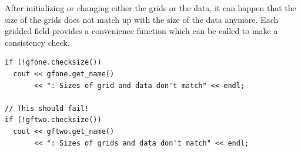 After initializing or changing either the grids or the data, it can happen that the size of the grids does not match up with the size of the data anymore. Each gridded field provides a convenience function which can be called to make a consistency check.

\begin{verbatim}
if (!gfone.checksize())
  cout << gfone.get_name()
       << ": Sizes of grid and data don't match" << endl;

// This should fail!
if (!gftwo.checksize())
  cout << gftwo.get_name()
       << ": Sizes of grids and data don't match" << endl;
\end{verbatim}


